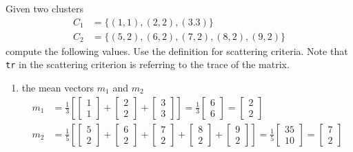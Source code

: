 \documentclass[12pt]{article}
\newcommand{\ques}[1]{\noindent {\bf Question #1: }}
\begin{document}
\ques{3} Given two clusters $$ \begin{aligned} C_1 &= \{(1,1), (2,2), (3.3)\} \\ C_2 &= \{(5,2), (6,2), (7,2), (8,2), (9,2)\} \end{aligned} $$ 
compute the following values. Use the definition for scattering criteria. Note that \texttt{tr} in the scattering criterion is referring to the trace of the matrix. 
\begin{enumerate} 
\item the mean vectors $m_1$ and $m_2$ 
$$ \begin{aligned} m_1 &= \frac{1}{3}\left[ \begin{bmatrix}1 \\ 1 \end{bmatrix} + \begin{bmatrix} 2 \\ 2 \end{bmatrix} + \begin{bmatrix} 3 \\ 3 \end{bmatrix} \right] = \frac{1}{3} \begin{bmatrix} 6 \\ 6 \end{bmatrix} = \begin{bmatrix} 2 \\ 2 \end{bmatrix} \\ 
m_2 &= \frac{1}{5} \left[ \begin{bmatrix} 5 \\ 2 \end{bmatrix} + \begin{bmatrix} 6 \\ 2 \end{bmatrix} + \begin{bmatrix} 7 \\ 2 \end{bmatrix} + \begin{bmatrix} 8 \\ 2 \end{bmatrix} + \begin{bmatrix} 9 \\ 2 \end{bmatrix} \right] = \frac{1}{5} \begin{bmatrix} 35 \\ 10 \end{bmatrix} = \begin{bmatrix} 7 \\ 2 \end{bmatrix}  \end{aligned} $$ 


\end{enumerate}
\end{document}
